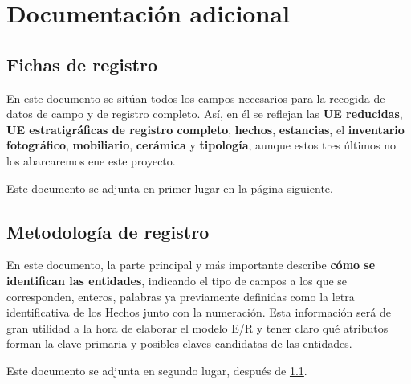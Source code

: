 \chapter{Documentación adicional}
\section{Fichas de registro} \label{sec:registrationforms}
En este documento se sitúan todos los campos necesarios para la recogida de datos de campo
y de registro completo. Así, en él se reflejan las \textbf{UE reducidas}, \textbf{UE
estratigráficas de registro completo},  \textbf{hechos}, \textbf{estancias}, el
\textbf{inventario fotográfico}, \textbf{mobiliario}, \textbf{cerámica} y \textbf{tipología},
aunque estos tres últimos no los abarcaremos ene este proyecto.

Este documento se adjunta en primer lugar en la página siguiente.

\section{Metodología de registro}
En este documento, la parte principal y más importante describe \textbf{cómo se identifican
las entidades}, indicando el tipo de campos a los que se corresponden, enteros, palabras ya
previamente definidas como la letra identificativa de los Hechos junto con la numeración. Esta
información será de gran utilidad a la hora de elaborar el modelo E/R y tener claro qué
atributos forman la clave primaria y posibles claves candidatas de las entidades.

Este documento se adjunta en segundo lugar, después de \ref{sec:registrationforms}.





